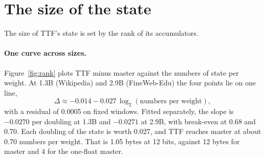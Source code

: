 \documentclass[10pt,twocolumn]{article}
\begin{document}
\begin{table}[t]
\caption{Training length and the ternary gap: a 15M model trained from scratch in full precision and with TTF (the
scratch recipe, $\theta=16$) on the same FineWeb-Edu stream, cooldown branches at 1, 2 and 5 times compute-optimal
(20 tokens per parameter). Fixed windows: the first 2000 of FineWeb-Edu validation (the scores shown), the 974 of
Wikipedia validation.}
\label{tab:depth15}
\end{table}

\section{The size of the state}\label{sec:rank}
The size of TTF's state is set by the rank of its accumulators.

\paragraph{One curve across sizes.} Figure~\ref{fig:rank} plots TTF minus master against the numbers of state per
weight. At 1.3B (Wikipedia) and 2.9B (FineWeb-Edu) the four points lie on one line,
\begin{equation}
  \Delta \approx -0.014 - 0.027\,\log_2(\text{numbers per weight}),
\end{equation}
with a residual of 0.0005 on fixed windows. Fitted separately, the slope is $-0.0270$ per doubling at 1.3B and $-0.0271$
at 2.9B, with break-even at 0.68 and 0.70. Each doubling of the state is worth 0.027, and TTF reaches master at about
0.70 numbers per weight. That is 1.05 bytes at 12 bits, against 12 bytes for master and 4 for the one-float master.
\end{document}
